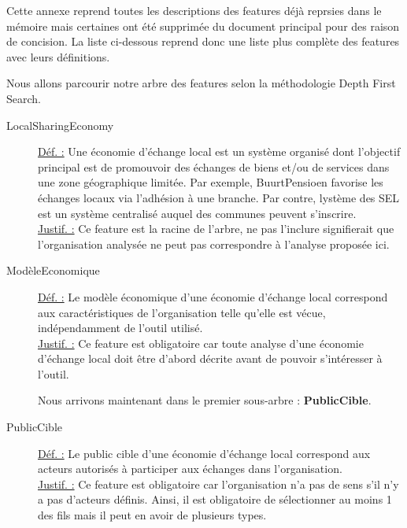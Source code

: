 Cette annexe reprend toutes les descriptions des features déjà reprsies dans le mémoire mais certaines ont été supprimée du document principal pour des raison de concision.  La liste ci-dessous reprend donc une liste plus complète des features avec leurs définitions.

Nous allons parcourir notre arbre des features selon la méthodologie Depth First Search.

\begin{description}

\item [LocalSharingEconomy]
\underline{Déf. :}  Une économie d'échange local est un système organisé dont l'objectif principal est de promouvoir des échanges de biens et/ou de services dans une zone géographique limitée.  Par exemple,  BuurtPensioen favorise les échanges locaux via l'adhésion à une branche.  Par contre,  lystème des SEL est un système centralisé auquel des communes peuvent s'inscrire.   
\\ \underline{Justif. :}  Ce feature est la racine de l'arbre,  ne pas l'inclure signifierait que l'organisation analysée ne peut pas correspondre à l'analyse proposée ici.
\newline

\item [ModèleEconomique]
\underline{Déf. :}  Le modèle économique d'une économie d'échange local correspond aux caractéristiques de l'organisation telle qu'elle est vécue,  indépendamment de l'outil utilisé.
\\ \underline{Justif. :}  Ce feature est obligatoire car toute analyse d'une économie d'échange local doit être d'abord décrite avant de pouvoir s'intéresser à l'outil.
\newline

Nous arrivons maintenant dans le premier sous-arbre : \textbf{PublicCible}.
\newline
\begin{center}
\end{center}

\item [PublicCible]
\underline{Déf. :}  Le public cible d'une économie d'échange local correspond aux acteurs autorisés à participer aux échanges dans l'organisation.
\\ \underline{Justif. :}  Ce feature est obligatoire car l'organisation n'a pas de sens s'il n'y a pas d'acteurs définis.  Ainsi,  il est obligatoire de sélectionner au moins 1 des fils mais il peut en avoir de plusieurs types.  
\newline


\end{description}
